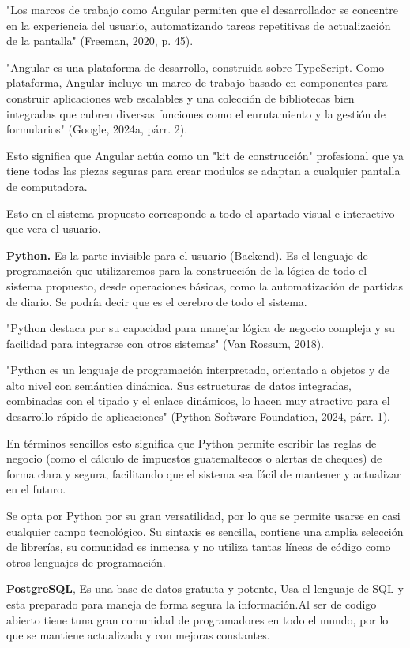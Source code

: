 "Los marcos de trabajo como Angular permiten que el desarrollador se concentre en la experiencia del usuario, automatizando tareas repetitivas de actualización de la pantalla" (Freeman, 2020, p. 45).

"Angular es una plataforma de desarrollo, construida sobre TypeScript. Como plataforma, Angular incluye un marco de trabajo basado en componentes para construir aplicaciones web escalables y una colección de bibliotecas bien integradas que cubren diversas funciones como el enrutamiento y la gestión de formularios" (Google, 2024a, párr. 2).

Esto significa que Angular actúa como un "kit de construcción" profesional que ya tiene todas las piezas seguras para crear modulos se adaptan a cualquier pantalla de computadora.

Esto en el sistema propuesto corresponde a todo el apartado visual e interactivo que vera el usuario.

\textbf{Python.} Es la parte invisible para el usuario (Backend). Es el lenguaje de programación que utilizaremos para la construcción de la lógica de todo el sistema propuesto, desde operaciones básicas, como la automatización de partidas de diario. Se podría decir que es el cerebro de todo el sistema.

"Python destaca por su capacidad para manejar lógica de negocio compleja y su facilidad para integrarse con otros sistemas" (Van Rossum, 2018).

"Python es un lenguaje de programación interpretado, orientado a objetos y de alto nivel con semántica dinámica. Sus estructuras de datos integradas, combinadas con el tipado y el enlace dinámicos, lo hacen muy atractivo para el desarrollo rápido de aplicaciones" (Python Software Foundation, 2024, párr. 1).

En términos sencillos esto significa que Python permite escribir las reglas de negocio (como el cálculo de impuestos guatemaltecos o alertas de cheques) de forma clara y segura, facilitando que el sistema sea fácil de mantener y actualizar en el futuro.

Se opta por Python por su gran versatilidad, por lo que se permite usarse en casi cualquier campo tecnológico. Su sintaxis es sencilla, contiene una amplia selección de librerías, su comunidad es inmensa y no utiliza tantas líneas de código como otros lenguajes de programación.

\textbf{PostgreSQL}, Es una base de datos gratuita y potente, Usa el lenguaje de SQL y esta preparado para maneja de forma segura la información.Al ser de codigo abierto tiene tuna gran comunidad de programadores en todo el mundo, por lo que se mantiene actualizada y con mejoras constantes.

